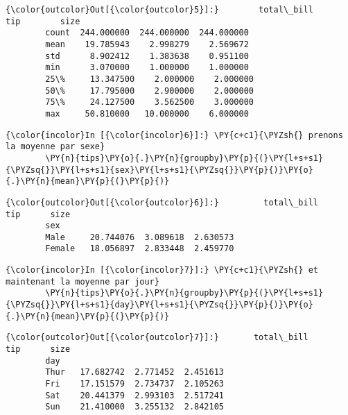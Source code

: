 \begin{Verbatim}[commandchars=\\\{\}]
{\color{outcolor}Out[{\color{outcolor}5}]:}        total\_bill         tip        size
        count  244.000000  244.000000  244.000000
        mean    19.785943    2.998279    2.569672
        std      8.902412    1.383638    0.951100
        min      3.070000    1.000000    1.000000
        25\%     13.347500    2.000000    2.000000
        50\%     17.795000    2.900000    2.000000
        75\%     24.127500    3.562500    3.000000
        max     50.810000   10.000000    6.000000
\end{Verbatim}
            
    \begin{Verbatim}[commandchars=\\\{\}]
{\color{incolor}In [{\color{incolor}6}]:} \PY{c+c1}{\PYZsh{} prenons la moyenne par sexe}
        \PY{n}{tips}\PY{o}{.}\PY{n}{groupby}\PY{p}{(}\PY{l+s+s1}{\PYZsq{}}\PY{l+s+s1}{sex}\PY{l+s+s1}{\PYZsq{}}\PY{p}{)}\PY{o}{.}\PY{n}{mean}\PY{p}{(}\PY{p}{)}
\end{Verbatim}


\begin{Verbatim}[commandchars=\\\{\}]
{\color{outcolor}Out[{\color{outcolor}6}]:}         total\_bill       tip      size
        sex                                   
        Male     20.744076  3.089618  2.630573
        Female   18.056897  2.833448  2.459770
\end{Verbatim}
            
    \begin{Verbatim}[commandchars=\\\{\}]
{\color{incolor}In [{\color{incolor}7}]:} \PY{c+c1}{\PYZsh{} et maintenant la moyenne par jour}
        \PY{n}{tips}\PY{o}{.}\PY{n}{groupby}\PY{p}{(}\PY{l+s+s1}{\PYZsq{}}\PY{l+s+s1}{day}\PY{l+s+s1}{\PYZsq{}}\PY{p}{)}\PY{o}{.}\PY{n}{mean}\PY{p}{(}\PY{p}{)}
\end{Verbatim}


\begin{Verbatim}[commandchars=\\\{\}]
{\color{outcolor}Out[{\color{outcolor}7}]:}       total\_bill       tip      size
        day                                 
        Thur   17.682742  2.771452  2.451613
        Fri    17.151579  2.734737  2.105263
        Sat    20.441379  2.993103  2.517241
        Sun    21.410000  3.255132  2.842105
\end{Verbatim}
            
